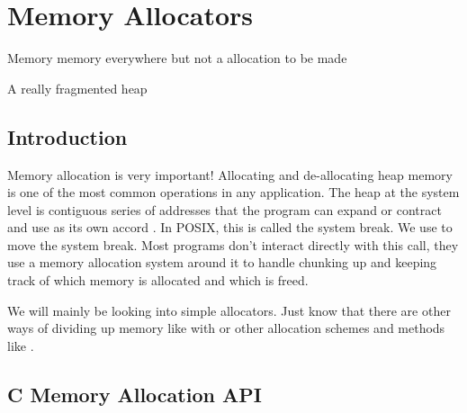 \chapter{Memory Allocators}

\epigraph{Memory memory everywhere but not a allocation to be made}{A really fragmented heap}

\section{Introduction}

Memory allocation is very important!
Allocating and de-allocating heap memory is one of the most common operations in any application.
The heap at the system level is contiguous series of addresses that the program can expand or contract and use as its own accord \cite{mallocinternals}.
In POSIX, this is called the system break.
We use  to move the system break.
Most programs don't interact directly with this call, they use a memory allocation system around it to handle chunking up and keeping track of which memory is allocated and which is freed.

We will mainly be looking into simple allocators.
Just know that there are other ways of dividing up memory like with  or other allocation schemes and methods like .

\section{C Memory Allocation API}


